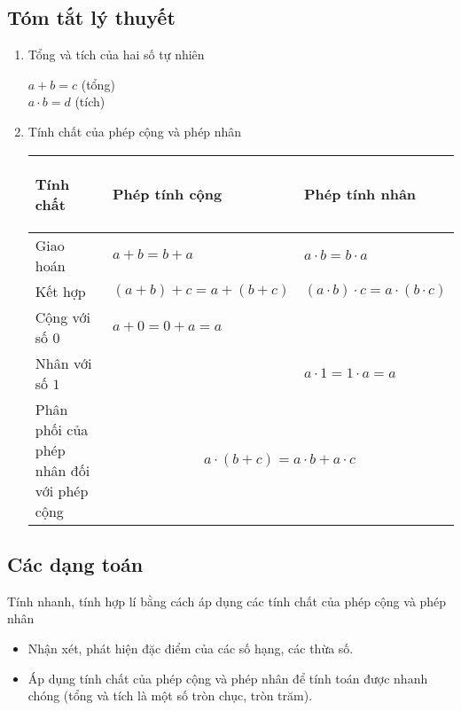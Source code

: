 \subsection{Tóm tắt lý thuyết}
\begin{enumerate}
	\item Tổng và tích của hai số tự nhiên
			\begin{center}
				$a + b = c$ (tổng)\\
				$a \cdot b = d$ (tích)
			\end{center}
	\item Tính chất của phép cộng và phép nhân
			\begin{center}
				\begin{tabular}{|m{5cm}|m{5cm}|m{5cm}|}
					\hline
					\begin{center} \textbf{Tính chất} \end{center} & \begin{center} \textbf{Phép tính cộng}  \end{center} & \begin{center} \textbf{Phép tính nhân}	\end{center}\\
					\hline
					Giao hoán & $a + b = b + a$ & $a \cdot b = b \cdot a$\\
					\hline
					Kết hợp & $(a + b) + c = a + (b + c)$ & $(a \cdot b) \cdot c = a \cdot (b \cdot c)$\\
					\hline
					Cộng với số $0$ & $a + 0 = 0 + a = a$ & \\
					\hline
					Nhân với số $1$ & & $a \cdot 1 = 1 \cdot a = a$\\
					\hline
					Phân phối của phép nhân đối với phép cộng & \multicolumn{2}{|c|}{$a \cdot (b + c) = a \cdot b + a \cdot c$}\\
					\hline
				\end{tabular}
			\end{center}
\end{enumerate}
\subsection{Các dạng toán}
	\begin{dang}{Tính nhanh, tính hợp lí bằng cách áp dụng các tính chất của phép cộng và phép nhân}
		\begin{itemize}
			\item Nhận xét, phát hiện đặc điểm của các số hạng, các thừa số.
			\item Áp dụng tính chất của phép cộng và phép nhân để tính toán được nhanh chóng (tổng và tích là một số tròn chục, tròn trăm).
		\end{itemize}
	\end{dang}
	
